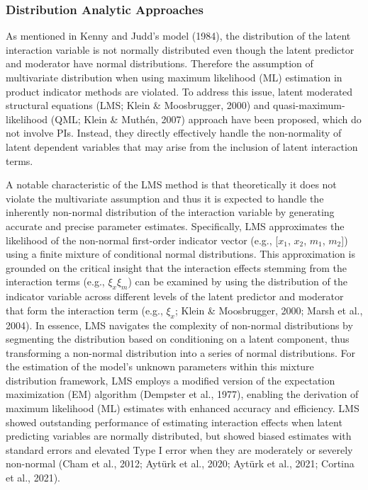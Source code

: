 \documentclass[
  man]{apa7}
\begin{document}
\hypertarget{distribution-analytic-approaches}{%
\subsubsection{Distribution Analytic Approaches}\label{distribution-analytic-approaches}}

As mentioned in Kenny and Judd's model (1984), the distribution of the latent interaction variable is not normally distributed even though the latent predictor and moderator have normal distributions. Therefore the assumption of multivariate distribution when using maximum likelihood (ML) estimation in product indicator methods are violated. To address this issue, latent moderated structural equations (LMS; Klein \& Moosbrugger, 2000) and quasi-maximum-likelihood (QML; Klein \& Muthén, 2007) approach have been proposed, which do not involve PIs. Instead, they directly effectively handle the non-normality of latent dependent variables that may arise from the inclusion of latent interaction terms.

A notable characteristic of the LMS method is that theoretically it does not violate the multivariate assumption and thus it is expected to handle the inherently non-normal distribution of the interaction variable by generating accurate and precise parameter estimates. Specifically, LMS approximates the likelihood of the non-normal first-order indicator vector (e.g., {[}\(x_{1}\), \(x_{2}\), \(m_{1}\), \(m_{2}\){]}) using a finite mixture of conditional normal distributions. This approximation is grounded on the critical insight that the interaction effects stemming from the interaction terms (e.g., \(\xi_{x}\xi_{m}\)) can be examined by using the distribution of the indicator variable across different levels of the latent predictor and moderator that form the interaction term (e.g., \(\xi_{x}\); Klein \& Moosbrugger, 2000; Marsh et al., 2004). In essence, LMS navigates the complexity of non-normal distributions by segmenting the distribution based on conditioning on a latent component, thus transforming a non-normal distribution into a series of normal distributions. For the estimation of the model's unknown parameters within this mixture distribution framework, LMS employs a modified version of the expectation maximization (EM) algorithm (Dempster et al., 1977), enabling the derivation of maximum likelihood (ML) estimates with enhanced accuracy and efficiency. LMS showed outstanding performance of estimating interaction effects when latent predicting variables are normally distributed, but showed biased estimates with standard errors and elevated Type I error when they are moderately or severely non-normal (Cham et al., 2012; Aytürk et al., 2020; Aytürk et al., 2021; Cortina et al., 2021).
\end{document}
